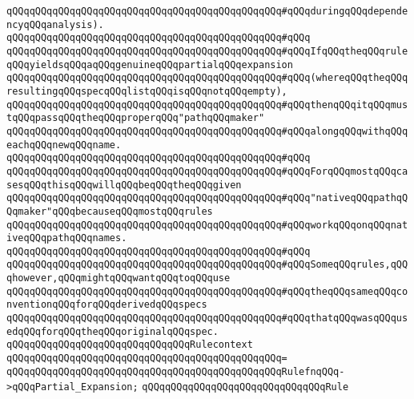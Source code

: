\verb|qQQqqQQqqQQqqQQqqQQqqQQqqQQqqQQqqQQqqQQqqQQqqQQq#qQQqduringqQQqdependencyqQQqanalysis).|\newline
\verb|qQQqqQQqqQQqqQQqqQQqqQQqqQQqqQQqqQQqqQQqqQQqqQQq#qQQq|\newline
\verb|qQQqqQQqqQQqqQQqqQQqqQQqqQQqqQQqqQQqqQQqqQQqqQQq#qQQqIfqQQqtheqQQqruleqQQqyieldsqQQqaqQQqgenuineqQQqpartialqQQqexpansion|\newline
\verb|qQQqqQQqqQQqqQQqqQQqqQQqqQQqqQQqqQQqqQQqqQQqqQQq#qQQq(whereqQQqtheqQQqresultingqQQqspecqQQqlistqQQqisqQQqnotqQQqempty),|\newline
\verb|qQQqqQQqqQQqqQQqqQQqqQQqqQQqqQQqqQQqqQQqqQQqqQQq#qQQqthenqQQqitqQQqmustqQQqpassqQQqtheqQQqproperqQQq"pathqQQqmaker"|\newline
\verb|qQQqqQQqqQQqqQQqqQQqqQQqqQQqqQQqqQQqqQQqqQQqqQQq#qQQqalongqQQqwithqQQqeachqQQqnewqQQqname.|\newline
\verb|qQQqqQQqqQQqqQQqqQQqqQQqqQQqqQQqqQQqqQQqqQQqqQQq#qQQq|\newline
\verb|qQQqqQQqqQQqqQQqqQQqqQQqqQQqqQQqqQQqqQQqqQQqqQQq#qQQqForqQQqmostqQQqcasesqQQqthisqQQqwillqQQqbeqQQqtheqQQqgiven|\newline
\verb|qQQqqQQqqQQqqQQqqQQqqQQqqQQqqQQqqQQqqQQqqQQqqQQq#qQQq"nativeqQQqpathqQQqmaker"qQQqbecauseqQQqmostqQQqrules|\newline
\verb|qQQqqQQqqQQqqQQqqQQqqQQqqQQqqQQqqQQqqQQqqQQqqQQq#qQQqworkqQQqonqQQqnativeqQQqpathqQQqnames.|\newline
\verb|qQQqqQQqqQQqqQQqqQQqqQQqqQQqqQQqqQQqqQQqqQQqqQQq#qQQq|\newline
\verb|qQQqqQQqqQQqqQQqqQQqqQQqqQQqqQQqqQQqqQQqqQQqqQQq#qQQqSomeqQQqrules,qQQqhowever,qQQqmightqQQqwantqQQqtoqQQquse|\newline
\verb|qQQqqQQqqQQqqQQqqQQqqQQqqQQqqQQqqQQqqQQqqQQqqQQq#qQQqtheqQQqsameqQQqconventionqQQqforqQQqderivedqQQqspecs|\newline
\verb|qQQqqQQqqQQqqQQqqQQqqQQqqQQqqQQqqQQqqQQqqQQqqQQq#qQQqthatqQQqwasqQQqusedqQQqforqQQqtheqQQqoriginalqQQqspec.|\newline
\newline
\verb|qQQqqQQqqQQqqQQqqQQqqQQqqQQqqQQqRulecontext|\newline
\verb|qQQqqQQqqQQqqQQqqQQqqQQqqQQqqQQqqQQqqQQqqQQqqQQq=|\newline
\verb|qQQqqQQqqQQqqQQqqQQqqQQqqQQqqQQqqQQqqQQqqQQqqQQqRulefnqQQq->qQQqPartial_Expansion;|\newline
\newline
\verb|qQQqqQQqqQQqqQQqqQQqqQQqqQQqqQQqRule|\newline
